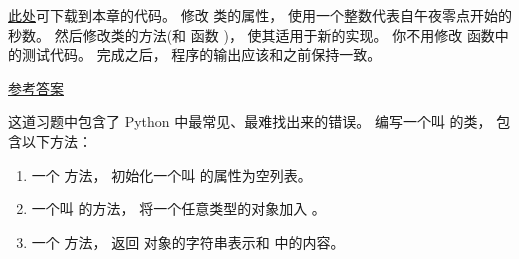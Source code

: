 \begin{exercise}

\href{http://thinkpython2.com/code/Time2.py}{此处}可下载到本章的代码。
修改 {\em {}} 类的属性， 使用一个整数代表自午夜零点开始的秒数。
然后修改类的方法(和 {\em {}} 函数 )， 使其适用于新的实现。
你不用修改 {\em {}} 函数中的测试代码。    完成之后， 程序的输出应该和之前保持一致。

\href{http://thinkpython2.com/code/Time2_soln.py}{参考答案}

\end{exercise}


\begin{exercise}
\label{kangaroo}


这道习题中包含了 Python 中最常见、最难找出来的错误。
编写一个叫 {\em {}} 的类， 包含以下方法：

\begin{enumerate}


\item 一个 {\em {}} 方法， 初始化一个叫 {\em {}} 的属性为空列表。

\item 一个叫 {\em {}} 的方法， 将一个任意类型的对象加入 {\em {}}。

\item 一个 {\em {}} 方法， 返回 {\em {}} 对象的字符串表示和 {\em {}} 中的内容。

\end{enumerate}

%


\end{exercise}
